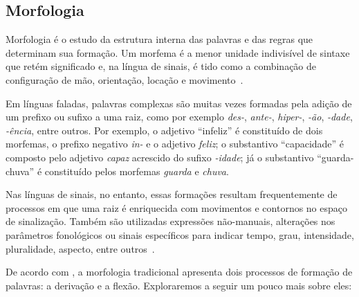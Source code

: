 \subsection{Morfologia}
\label{sec:linguistica-morfologia}

Morfologia é o estudo da estrutura interna das palavras e das regras que determinam sua formação. Um morfema é a menor unidade indivisível de sintaxe que retém significado e, na língua de sinais, é tido como a combinação de configuração de mão, orientação, locação e movimento~\cite{quadros-2004-estudos-linguisticos,jay-2011-dont-just-sign,hill-2019-sign-languages}.



Em línguas faladas, palavras complexas são muitas vezes formadas pela adição de um prefixo ou sufixo a uma raiz, como por exemplo \textit{des-}, \textit{ante-}, \textit{hiper-}, \textit{-ão}, \textit{-dade}, \textit{-ência}, entre outros. Por exemplo, o adjetivo ``infeliz'' é constituído de dois morfemas, o prefixo negativo \textit{in-} e o adjetivo \textit{feliz}; o substantivo ``capacidade'' é composto pelo adjetivo \textit{capaz} acrescido do sufixo \textit{-idade}; já o substantivo ``guarda-chuva'' é constituído pelos morfemas \textit{guarda} e \textit{chuva}.

Nas línguas de sinais, no entanto, essas formações resultam frequentemente de processos em que uma raiz é enriquecida com movimentos e contornos no espaço de sinalização. Também são utilizadas expressões não-manuais, alterações nos parâmetros fonológicos ou sinais específicos para indicar tempo, grau, intensidade, pluralidade, aspecto, entre outros~\cite{klima-1975-wit-poetry-asl,quadros-2004-estudos-linguisticos}.

De acordo com , a morfologia tradicional apresenta dois processos de formação de palavras: a derivação e a flexão. Exploraremos a seguir um pouco mais sobre eles:

